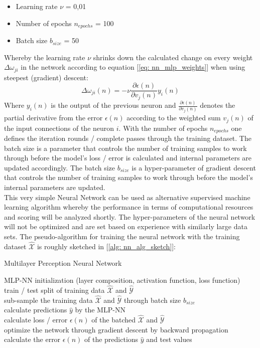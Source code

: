 \documentclass[12pt, a4paper]{article}
\begin{document}
\begin{itemize}
    \item Learning rate $\nu$ = 0,01
    \item Number of epochs $n_{epochs}$ = 100
    \item Batch size $b_{size}$ = 50
\end{itemize}
Whereby the learning rate $\nu$ shrinks down the calculated change on every weight $\Delta \omega_{ji}$ in the network according to equation [\ref{eq: nn_mlp_weights}] when using steepest (gradient) descent:
\begin{equation}
    \label{eq: nn_mlp_weights}
    \Delta \omega_{ji}(n) = - \nu \frac{\partial \epsilon(n)}{\partial v_j(n)} y_i(n)
\end{equation}
Where $y_i(n)$ is the output of the previous neuron and $\frac{\partial \epsilon(n)}{\partial v_j(n)}$ denotes the partial derivative from the error $\epsilon(n)$ according to the weighted sum $v_j(n)$ of the input connections of the neuron $i$.
With the number of epochs $n_{epochs}$ one defines the iteration rounds / complete passes through the training dataset. The batch size is a parameter that controls the number of training samples to work through before the model's loss / error is calculated and internal parameters are updated accordingly. The batch size $b_{size}$ is a hyper-parameter of gradient descent that controls the number of training samples to work through before the model’s internal parameters are updated. \\
This very simple Neural Network can be used as alternative supervised machine learning algorithm whereby the performance in terms of computational resources and scoring will be analyzed shortly. The hyper-parameters of the neural network will not be optimized and are set based on experience with similarly large data sets. The pseudo-algorithm for training the neural network with the training dataset $\hat{\mathcal{X}}$ is roughly sketched in [\ref{alg: nn_alg_sketch}]:
\begin{algorithm}
\caption{Multilayer Perception Neural Network}
\label{alg: nn_alg_sketch}
    MLP-NN initialization (layer composition, activation function, loss function)\\
    train / test split of training data $\hat{\mathcal{X}}$ and $\hat{\mathcal{Y}}$ \\
    {
    {
    sub-sample the training data $\hat{\mathcal{X}}$ and $\hat{\mathcal{Y}}$ through batch size $b_{size}$ \\
    calculate predictions $\hat{y}$ by the MLP-NN \\
    calculate loss / error $\epsilon(n)$ of the batched $\hat{\mathcal{X}}$ and $\hat{\mathcal{Y}}$\\
    optimize the network through gradient descent by backward propagation \\
    }
    calculate the error $\epsilon(n)$ of the predictions $\hat{y}$ and test values
    }
\end{algorithm}
\end{document}

